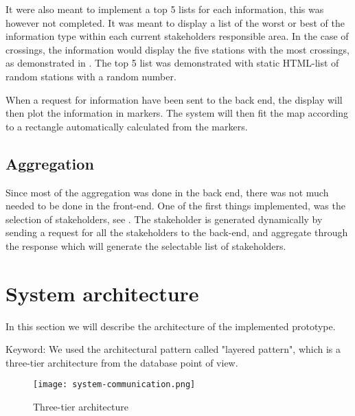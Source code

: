 It were also meant to implement a top 5 lists for each information, this was
however not completed. It was meant to display a list of the worst or best of
the information type within each current stakeholders responsible area. In the
case of crossings, the information would display the five stations with the 
most crossings, as demonstrated in . The top 5 list was 
demonstrated with static HTML-list of random stations with a random number.

When a request for information have been sent to the back end, the display will
then plot the information in markers. The system will then fit the map
according to a rectangle automatically calculated from the markers.

\subsection{Aggregation} %
\label{sub:front_end_aggregation}
Since most of the aggregation was done in the back end, there was not much
needed to be done in the front-end. One of the first things implemented, was 
the selection of stakeholders, see . The
stakeholder is generated dynamically by sending a request for all the 
stakeholders to the back-end, and aggregate through the response which will 
generate the selectable list of stakeholders. 


\section{System architecture} %
\label{sec:system_architecture}
In this section we will describe the architecture of the implemented prototype.

Keyword:
We used the architectural pattern called "layered pattern"\cite[pp. 205-210]{Bass:2012:SAP:2392670}, which is a three-tier architecture from the database 
point of view\cite[pp. 294-297]{toftHanseMallaugDatabaser}.

\begin{figure}[!htbp]
	\texttt{[image: system-communication.png]}
	\caption[Three-tier architecture]{Three-tier architecture}
	\label{fig:three-tier_architecture}
\end{figure}

